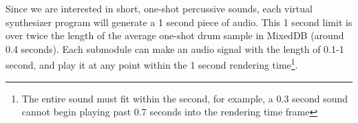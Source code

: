 \documentclass[\main/thesis.tex]{subfiles}
\begin{document}
Since we are interested in short, one-shot percussive sounds, each virtual synthesizer program will generate a 1 second piece of audio. This 1 second limit is over twice the length of the average one-shot drum sample in MixedDB (around 0.4 seconds). Each submodule can make an audio signal with the length of 0.1-1 second, and play it at any point within the 1 second rendering time\footnote{The entire sound must fit within the second, for example, a 0.3 second sound cannot begin playing past 0.7 seconds into the rendering time frame}.
\begin{table}[t!]
\centering
{}
\caption{Synthesizer submodule parameters. Despite the simplicity of the parameters and efforts at constraining the ranges, the number of parameters that can be randomly chosen for each submodule is in the order of $10^{15}$ }
\label{table:submodule_params}
\end{table}
\end{document}
